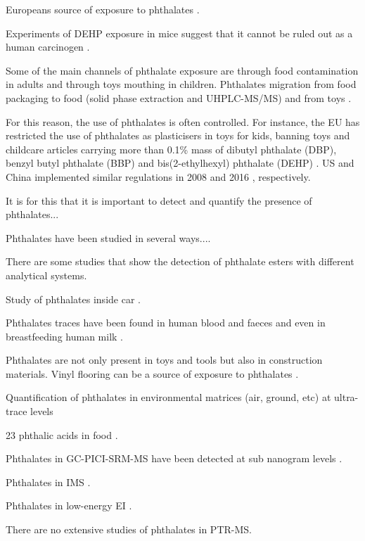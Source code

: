 Europeans source of exposure to phthalates \cite{wormuth2006sources}.

Experiments of  DEHP exposure  in mice suggest that it cannot be ruled out as a human carcinogen \cite{rusyn2012mechanistic}.


Some of the main channels of phthalate exposure are through food contamination in adults and through toys mouthing in children. Phthalates migration from food packaging to food (solid phase extraction and UHPLC-MS/MS)  \cite{fan2012determination} and from toys \cite{earls2003gas}.

For this reason, the use of phthalates is often controlled. For instance, the EU has restricted the use of phthalates as plasticisers in toys for kids, banning toys and childcare articles carrying more than  0.1\% mass of dibutyl phthalate (DBP), benzyl butyl phthalate (BBP) and bis(2-ethylhexyl) phthalate (DEHP) \cite{Parliament2005}. US and China  implemented similar regulations in 2008 \cite{USban} and 2016 \cite{chinaGB6675}, respectively. 


It is for this that it is important to detect and quantify the presence of phthalates...

Phthalates have been studied in several ways....

There are some studies that show the detection of phthalate esters with different analytical systems.


Study of phthalates inside car \cite{geiss2009investigation}.

Phthalates traces have been found in human blood and faeces \cite{de2014review} and even in breastfeeding human milk \cite{zhu2006phthalate}.

Phthalates are not only present in toys and tools but also in construction materials. Vinyl flooring can be a source of exposure to phthalates \cite{gong2018letter}.

Quantification of phthalates in environmental matrices (air, ground, etc) at ultra-trace levels \cite{net2015reliable}

23 phthalic acids in food \cite{xu2014determination}.

Phthalates in GC-PICI-SRM-MS have been detected at sub nanogram levels \cite{GC-PICI-phthalates}.

Phthalates in IMS \cite{michalczuk2019isomer}.

Phthalates in low-energy EI \cite{lacko2018dissociation}.

There are no extensive studies of phthalates in PTR-MS. 

